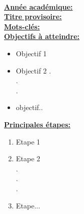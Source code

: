 
\begin{center}
\end{center}
~\\[0.5cm]
\begin{spacing}{1.5}
\noindent
\underline{\textbf{Année académique:}} \anneeAcad \\[0.5cm]
\underline{\textbf{Titre provisoire:}} \titre \\[0.1cm]
\underline{\textbf{Mots-clés:}} \motsCles \\[0.7cm]
\underline{\textbf{Objectifs à atteindre:}}\vspace{0.3cm}
\begin{itemize}
    \item Objectif 1
    \item Objectif 2
    .\\.\\.\\
    \item objectif..
\end{itemize}
\underline{\textbf{Principales étapes:}}\vspace{0.3cm}
\begin{enumerate}[label=\arabic*)]
    \item Etape 1 
    \item Etape 2\\
    .\\
    .\\
    .\\
    \item Etape...
\end{enumerate}
\end{spacing}
\newpage




